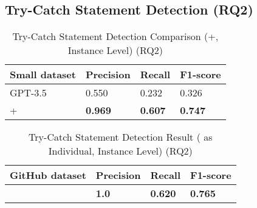 \subsection{Try-Catch Statement Detection (RQ2)}
\label{sec:rq2}

\begin{table}[t]%
  \caption{Try-Catch Statement Detection Comparison ({\xblock}+{\xstate}, Instance Level) (RQ2)}
  \vspace{-12pt}
  \small
	\begin{center}
		\renewcommand{\arraystretch}{1}
		\begin{tabular}{| p{3.05cm}<{\centering} | p{1.2cm}<{\centering} | p{1.2cm}<{\centering}| p{1.2cm}<{\centering}|}
		  \hline
		Small dataset	  & Precision  & Recall & F1-score \\
			\hline
                        GPT-3.5 & 0.550 & 0.232 & 0.326 \\
			\hline
			\xblock + \xstate   & \textbf{0.969}  &  \textbf{0.607} & \textbf{0.747}\\
			\hline
		\end{tabular}
		\label{tab:xstate-1}
	\end{center}
\end{table}

\begin{table}[t]%
\caption{Try-Catch Statement Detection Result ({\xstate} as Individual, Instance Level) (RQ2)}
  \vspace{-12pt}
  \small
	\begin{center}
		\renewcommand{\arraystretch}{1}
		\begin{tabular}{| p{3.05cm}<{\centering} | p{1.2cm}<{\centering} | p{1.2cm}<{\centering}| p{1.2cm}<{\centering}|}
		  \hline
		GitHub dataset	  & Precision  & Recall & F1-score \\
			\hline
			\xstate  & \textbf{1.0}  &  \textbf{0.620} & \textbf{0.765}\\
			\hline
		\end{tabular}
		\label{tab:xstate-2}
	\end{center}
\end{table}


